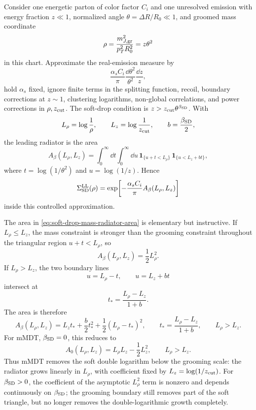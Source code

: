 \begin{controlledapproximation}
\label{ca:soft-drop-mass-fixed-coupling-radiator}
Consider one energetic parton of color factor \(C_i\) and one unresolved
emission with energy fraction \(z\ll1\), normalized angle
\(\theta=\Delta R/R_0\ll1\), and groomed mass coordinate
\[
  \rho=\frac{m_{J,{\rm gr}}^2}{p_T^2R_0^2}=z\theta^2
\]
in this chart.  Approximate the real-emission measure by
\[
  \frac{\alpha_s C_i}{\pi}\frac{\dd\theta^2}{\theta^2}\frac{\dd z}{z},
\]
hold \(\alpha_s\) fixed, ignore finite terms in the splitting function,
recoil, boundary corrections at \(z\sim1\), clustering logarithms, non-global
correlations, and power corrections in \(\rho,z_{\rm cut}\).  The soft-drop
condition is \(z>z_{\rm cut}\theta^{\beta_{\rm SD}}\).  With
\[
  L_\rho=\log\frac1\rho,\qquad
  L_z=\log\frac1{z_{\rm cut}},\qquad
  b=\frac{\beta_{\rm SD}}{2},
\]
the leading radiator is the area
\begin{equation}
  A_\beta(L_\rho,L_z)
  =
  \int_0^\infty\dd t\int_0^\infty\dd u\,
  \mathbf 1_{\{u+t<L_\rho\}}\,
  \mathbf 1_{\{u<L_z+bt\}},
  \label{eq:soft-drop-mass-radiator-area}
\end{equation}
where \(t=\log(1/\theta^2)\) and \(u=\log(1/z)\).  Hence
\begin{equation}
  \Sigma_{\rm SD}^{\rm LL}(\rho)
  =
  \exp\!\left[
    -\frac{\alpha_s C_i}{\pi}A_\beta(L_\rho,L_z)
  \right]
  \label{eq:soft-drop-mass-fixed-coupling-sudakov}
\end{equation}
inside this controlled approximation.
\end{controlledapproximation}

The area in \eqref{eq:soft-drop-mass-radiator-area} is elementary but
instructive.  If \(L_\rho\leq L_z\), the mass constraint is stronger than the
grooming constraint throughout the triangular region \(u+t<L_\rho\), so
\[
  A_\beta(L_\rho,L_z)=\frac12 L_\rho^2 .
\]
If \(L_\rho>L_z\), the two boundary lines
\[
  u=L_\rho-t,\qquad u=L_z+bt
\]
intersect at
\[
  t_*=\frac{L_\rho-L_z}{1+b}.
\]
The area is therefore
\begin{equation}
  A_\beta(L_\rho,L_z)
  =
  L_z t_*+\frac{b}{2}t_*^2
  +\frac12(L_\rho-t_*)^2,
  \qquad
  t_*=\frac{L_\rho-L_z}{1+b},
  \qquad
  L_\rho>L_z .
  \label{eq:soft-drop-mass-radiator-closed-form}
\end{equation}
For mMDT, \(\beta_{\rm SD}=0\), this reduces to
\begin{equation}
  A_0(L_\rho,L_z)
  =
  L_\rho L_z-\frac12L_z^2,
  \qquad L_\rho>L_z .
  \label{eq:mmdt-single-log-radiator}
\end{equation}
Thus mMDT removes the soft double logarithm below the grooming scale: the
radiator grows linearly in \(L_\rho\), with coefficient fixed by
\(L_z=\log(1/z_{\rm cut})\).  For \(\beta_{\rm SD}>0\), the coefficient of
the asymptotic \(L_\rho^2\) term is nonzero and depends continuously on
\(\beta_{\rm SD}\); the grooming boundary still removes part of the soft
triangle, but no longer removes the double-logarithmic growth completely.

